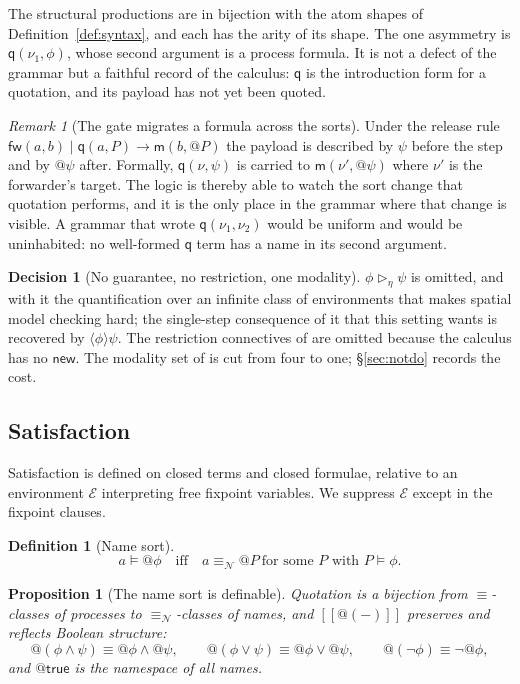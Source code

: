 \documentclass[11pt]{article}
\makeatletter
\theoremstyle{plain}
\newtheorem{proposition}[theorem]{Proposition}
\theoremstyle{definition}
\newtheorem{definition}[theorem]{Definition}
\newtheorem{decision}[theorem]{Decision}
\theoremstyle{remark}
\newtheorem{remark}[theorem]{Remark}
\newcommand{\quo}[1]{@#1}
\newcommand{\nequiv}{\equiv_{\mathcal{N}}}
\newcommand{\mm}{\mathsf{m}}
\newcommand{\fw}{\mathsf{fw}}
\newcommand{\qq}{\mathsf{q}}
\newcommand{\red}{\longrightarrow}
\newcommand{\scong}{\equiv}
\newcommand{\env}{\mathcal{E}}
\newcommand{\may}[1]{\langle #1 \rangle}
\newcommand{\sat}{\models}
\newcommand{\sem}[1]{[\![#1]\!]}
\makeatother
\begin{document}
The structural productions are in bijection with the atom shapes of
Definition~\ref{def:syntax}, and each has the arity of its shape. The one
asymmetry is $\qq(\nu_1,\phi)$, whose second argument is a process formula. It
is not a defect of the grammar but a faithful record of the calculus: $\qq$ is
the introduction form for a quotation, and its payload has not yet been quoted.

\begin{remark}[The gate migrates a formula across the sorts]
\label{rem:migrate}
Under the release rule $\fw(a,b) \mid \qq(a,P) \red \mm(b,\quo{P})$ the payload
is described by $\psi$ before the step and by $\quo{\psi}$ after. Formally,
$\qq(\nu,\psi)$ is carried to $\mm(\nu',\quo{\psi})$ where $\nu'$ is the
forwarder's target. The logic is thereby able to watch the sort change that
quotation performs, and it is the only place in the grammar where that change is
visible. A grammar that wrote $\qq(\nu_1,\nu_2)$ would be uniform and would be
uninhabited: no well-formed $\qq$ term has a name in its second argument.
\end{remark}

\begin{decision}[No guarantee, no restriction, one modality]
\label{dec:omit}
$\phi \rhd_{\eta} \psi$ is omitted, and with it the quantification over an
infinite class of environments that makes spatial model checking hard; the
single-step consequence of it that this setting wants is recovered by
$\may{\phi}\psi$. The restriction connectives of \cite{f1r3space} are omitted
because the calculus has no $\mathsf{new}$. The modality set of
\cite{softwhere} is cut from four to one; \S\ref{sec:notdo} records the cost.
\end{decision}

\subsection{Satisfaction}

Satisfaction is defined on closed terms and closed formulae, relative to an
environment $\env$ interpreting free fixpoint variables. We suppress $\env$
except in the fixpoint clauses.

\begin{definition}[Name sort]
\label{def:satname}
\[
  a \sat \quo{\phi} \quad\text{iff}\quad
  a \nequiv \quo{P} \ \text{for some } P \text{ with } P \sat \phi .
\]
\end{definition}

\begin{proposition}[The name sort is definable]
\label{prop:namecollapse}
Quotation is a bijection from $\scong$-classes of processes to $\nequiv$-classes
of names, and $\sem{\quo{(-)}}$ preserves and reflects Boolean structure:
\[
  \quo{(\phi \wedge \psi)} \equiv \quo{\phi} \wedge \quo{\psi},
  \qquad
  \quo{(\phi \vee \psi)} \equiv \quo{\phi} \vee \quo{\psi},
  \qquad
  \quo{(\neg\phi)} \equiv \neg\quo{\phi},
\]
and $\quo{\mathsf{true}}$ is the namespace of all names.
\end{proposition}
\end{document}
